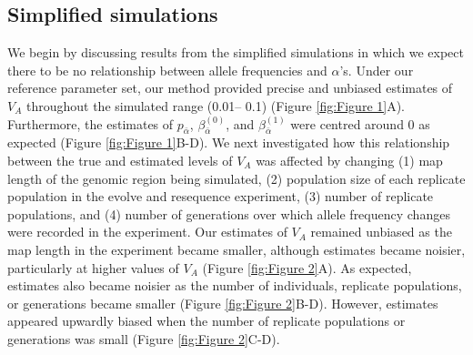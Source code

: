 \documentclass[12pt]{article}
\begin{document}
\begin{bibunit}
\subsection*{Simplified simulations}

We begin by discussing results from the simplified simulations in which we expect there to be no relationship between allele frequencies and $\alpha$'s. Under our reference parameter set, our method provided precise and unbiased estimates of $V_A$ throughout the simulated range (0.01-- 0.1) (Figure \ref{fig:Figure 1}A). Furthermore, the estimates of $p_{\bar \alpha} $, $\beta^{(0)}_{\bar{\alpha}}$, and $\beta^{(1)}_{\bar{\alpha}}$ were centred around 0 as expected (Figure \ref{fig:Figure 1}B-D). We next investigated how this relationship between the true and estimated levels of $V_A$ was affected by changing (1) map length of the genomic region being simulated, (2) population size of each replicate population in the evolve and resequence experiment, (3) number of replicate populations, and (4) number of generations over which allele frequency changes were recorded in the experiment. Our estimates of $V_A$ remained unbiased as the map length in the experiment became smaller, although estimates became noisier, particularly at higher values of $V_A$ (Figure \ref{fig:Figure 2}A).  As expected, estimates also became noisier as the number of individuals, replicate populations, or generations became smaller (Figure \ref{fig:Figure 2}B-D). However, estimates appeared upwardly biased when the number of replicate populations or generations was small (Figure \ref{fig:Figure 2}C-D). 


\end{bibunit}
\end{document}
